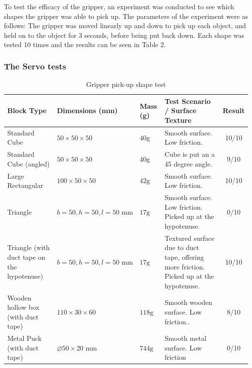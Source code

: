 To test the efficacy of the gripper, an experiment was conducted to see which shapes the gripper was able to pick up. The parameters of the experiment were as follows: The gripper was moved linearly up and down to pick up each object, and held on to the object for 3 seconds, before being put back down. Each shape was tested 10 times and the results can be seen in Table 2.

\subsubsection{The Servo tests }


\begin{table}[H]
    \centering
    \caption{Gripper pick-up shape test}
    \label{tab:gripper_test_matrix}
    \begin{tabular}{| p{3.5cm} | p{2.2cm} | p{2.2cm} | p{5.5cm} | c |} 
        \hline
        \textbf{Block Type} & \textbf{Dimensions (mm)} & \textbf{Mass (g)} & \textbf{Test Scenario / Surface Texture} & \textbf{Result} \\ \hline
        Standard Cube & $50 \times 50 \times 50$ & $40\text{g}$ & Smooth surface. Low friction. & 10/10 \\ \hline
        Standard Cube (angled) & $50 \times 50 \times 50$ & $40\text{g}$ & Cube is put an a 45 degree angle. & 9/10 \\ \hline
        Large Rectangular & $100 \times 50 \times 50$ & $42\text{g}$ & Smooth surface. Low friction. & 10/10 \\ \hline
        Triangle & $b=50, h=50, l=50\text{ mm}$ & $17\text{g}$ & Smooth surface. Low friction. Picked up at the hypotenuse. & 0/10 \\ \hline
        Triangle (with duct tape on the hypotenuse) & $b=50, h=50, l=50\text{ mm}$ & $17\text{g}$ & Textured surface due to duct tape, offering more friction. Picked up at the hypotenuse. & 10/10 \\ \hline
        Wooden hollow box (with duct tape) & $110 \times 30 \times 60$ & $118\text{g}$ & Smooth wooden surface. Low friction.. & 8/10 \\ \hline
        Metal Puck (with duct tape) & $\varnothing 50 \times 20\text{ mm}$ & $744\text{g}$ & Smooth metal surface. Low friction & 0/10 \\ \hline
      
       
    \end{tabular}
\end{table}


